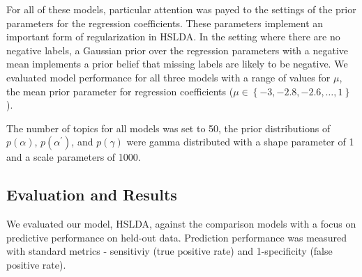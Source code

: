 
For all of these models, particular attention was payed to the settings of the
prior parameters for the regression coefficients. These parameters implement an
important form of regularization in HSLDA. In the setting where there are no negative
labels, a Gaussian prior over the regression parameters with a negative mean implements
a prior belief that missing labels are likely to be negative. We evaluated model performance 
for all three models with a range of values for $\mu$, the mean prior parameter for regression coefficients
($\mu\in\left\{ -3,-2.8,-2.6,\ldots,1\right\}$).

The number of topics for all
models was set to 50, the prior distributions of
$p\left(\alpha\right)$, $p\left(\alpha^{\prime}\right)$, and $p\left(\gamma\right)$ were gamma distributed with a shape parameter of 1
and a scale parameters of 1000.


\subsection{Evaluation and Results}


We evaluated our model, HSLDA, against the comparison models with a focus
on predictive performance on held-out data. Prediction performance was measured with
standard metrics - sensitiviy (true positive rate) and 
1-specificity (false positive rate).

